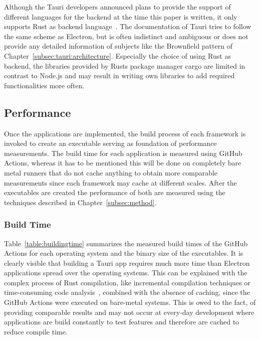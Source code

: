 Although the Tauri developers announced plans to provide the support of different languages for the backend at the time this paper is written, it only supports Rust as backend language~\cite{tauri}.
The documentation of Tauri tries to follow the same scheme as Electron, but is often indistinct and ambiguous or does not provide any detailed information of subjects like the Brownfield pattern of Chapter~\ref{subsec:tauri:architecture}.
Especially the choice of using Rust as backend, the libraries provided by Rusts package manager cargo are limited in contrast to Node.js and may result in writing own libraries to add required functionalities more often.

\subsection{Performance}
\label{subsec:impl:performance}
Once the applications are implemented, the build process of each framework is invoked to create an executable serving as foundation of performance measurements.
The build time for each application is measured using GitHub Actions, whereas it has to be mentioned this will be done on completely bare metal runners that do not cache anything to obtain more comparable measurements
since each framework may cache at different scales.
After the executables are created the performance of both are measured using the techniques described in Chapter~\ref{subsec:method}.

\subsubsection{Build Time}
\label{subsubsec:perf:buildtime}
Table~\ref{table:buildingtime} summarizes the measured build times of the GitHub Actions for each operating system and the binary size of the executables.
It is clearly visible that building a Tauri app requires much more time than Electron applications spread over the operating systems.
This can be explained with the complex process of Rust compilation, like incremental compilation techniques or time-consuming code analysis~\cite{rustCompileTime}, combined with the absence
of caching, since the GitHub Actions were executed on bare-metal systems.
This is owed to the fact, of providing comparable results and may not occur at every-day development where applications are build constantly to test features and therefore are cached to reduce compile time.

